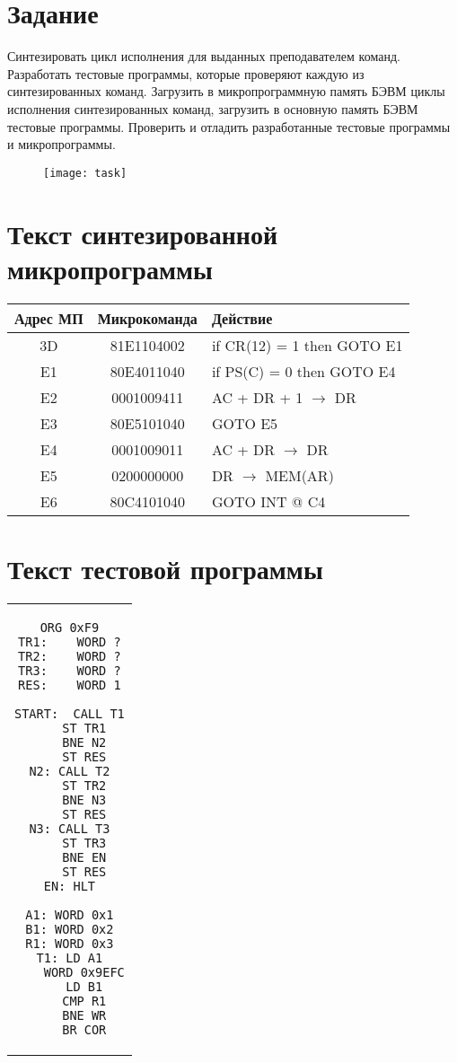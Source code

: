 \tableofcontents

\newpage

\section{Задание}
Синтезировать цикл исполнения для выданных преподавателем команд. Разработать тестовые программы, которые проверяют каждую из синтезированных команд. Загрузить в микропрограммную память БЭВМ циклы исполнения синтезированных команд, загрузить в основную память БЭВМ тестовые программы. Проверить и отладить разработанные тестовые программы и микропрограммы.
\begin{figure}[H]
\centering
\texttt{[image: task]}
\label{pic:task}
\end{figure}

\section{Текст синтезированной микропрограммы}
\begin{center}
\begin{tabular}{|c|c|l|}
\hline
\textbf{Адрес МП} & \textbf{Микрокоманда} & \textbf{Действие}\\
\hline
3D & 81E1104002 & if CR(12) = 1 then GOTO E1\\
\hline
E1 & 80E4011040 & if PS(C) = 0 then GOTO E4\\
E2 & 0001009411 & AC + DR + 1 $\rightarrow$ DR\\
E3 & 80E5101040 & GOTO E5\\
E4 & 0001009011 & AC + DR $\rightarrow$ DR\\
E5 & 0200000000 & DR $\rightarrow$ MEM(AR)\\
E6 & 80C4101040 & GOTO INT @ C4\\
\hline
\end{tabular}
\end{center}

\section{Текст тестовой программы}
\begin{center}
\begin{tabular}{c}
\begin{lstlisting}[basicstyle=\ttfamily]
	ORG 0xF9
TR1:	WORD ?
TR2:	WORD ?
TR3:	WORD ?
RES:	WORD 1

START:	CALL T1
	ST TR1
	BNE N2
	ST RES
N2:	CALL T2
	ST TR2
	BNE N3
	ST RES
N3:	CALL T3
	ST TR3
	BNE EN
	ST RES
EN:	HLT

A1:	WORD 0x1
B1:	WORD 0x2
R1:	WORD 0x3
T1:	LD A1
	WORD 0x9EFC
	LD B1
	CMP R1
	BNE WR
	BR COR
\end{lstlisting}
\end{tabular}
\end{center}


